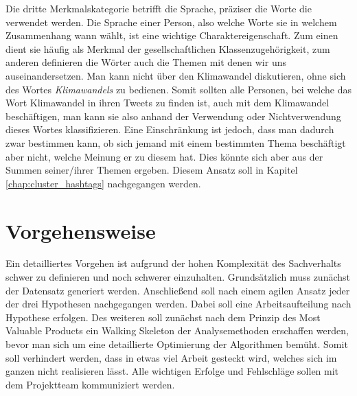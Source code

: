 Die dritte Merkmalskategorie betrifft die Sprache, präziser die Worte die verwendet werden. Die Sprache einer Person, also welche Worte sie in welchem Zusammenhang wann wählt, ist eine wichtige Charaktereigenschaft. Zum einen dient sie häufig als Merkmal der gesellschaftlichen Klassenzugehörigkeit, zum anderen definieren die Wörter auch die Themen mit denen wir uns auseinandersetzen. Man kann nicht über den Klimawandel diskutieren, ohne sich des Wortes \textit{Klimawandels} zu bedienen. Somit sollten alle Personen, bei welche das Wort Klimawandel in ihren Tweets zu finden ist, auch mit dem Klimawandel beschäftigen, man kann sie also anhand der Verwendung oder Nichtverwendung dieses Wortes klassifizieren. Eine Einschränkung ist jedoch, dass man dadurch zwar bestimmen kann, ob sich jemand mit einem bestimmten Thema beschäftigt aber nicht, welche Meinung er zu diesem hat. Dies könnte sich aber aus der Summen seiner/ihrer Themen ergeben. Diesem Ansatz soll in Kapitel \ref{chap:cluster_hashtags} nachgegangen werden. 
\section{Vorgehensweise}
\label{sec:vorgehensweise}
Ein detailliertes Vorgehen ist aufgrund der hohen Komplexität des Sachverhalts schwer zu definieren und noch schwerer einzuhalten. Grundsätzlich muss zunächst der Datensatz generiert werden. Anschließend soll nach einem agilen Ansatz jeder der drei Hypothesen nachgegangen werden. Dabei soll eine Arbeitsaufteilung nach Hypothese erfolgen. Des weiteren soll zunächst nach dem Prinzip des Most Valuable Products ein Walking Skeleton der Analysemethoden erschaffen werden, bevor man sich um eine detaillierte Optimierung der Algorithmen bemüht. Somit soll verhindert werden, dass in etwas viel Arbeit gesteckt wird, welches sich im ganzen nicht realisieren lässt. Alle wichtigen Erfolge und Fehlschläge sollen mit dem Projektteam kommuniziert werden.